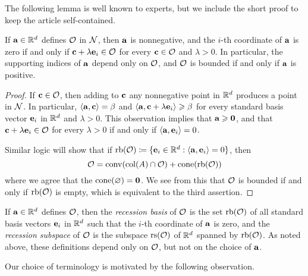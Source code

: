 \documentclass[11pt]{amsart}
\begin{document}
The following lemma is well known to experts, but we include the short proof to keep the article self-contained.

\begin{lemma} 
\label{face: L}
If $\mathbf{a} \in \mathbb{R}^d$ defines $\mathcal{O}$ in $\mathcal{N}$, then $\mathbf{a}$ is nonnegative, and the $i$-th coordinate of $\mathbf{a}$ is zero if and only if $\mathbf{c} + \lambda \mathbf{e}_i \in \mathcal{O}$  for every $\mathbf{c} \in \mathcal{O}$ and $\lambda > 0$.  In particular, the supporting indices of $\mathbf{a}$ depend only on $\mathcal{O}$, and $\mathcal{O}$ is bounded if and only if $\mathbf{a}$ is positive. 
\end{lemma}

\begin{proof}  If $\mathbf{c} \in \mathcal{O}$, then adding to $\mathbf{c}$ any nonnegative point in $\mathbb{R}^d$ produces a point in $\mathcal{N}$.  In particular, $\langle \mathbf{a}, \mathbf{c} \rangle = \beta$ and $\langle \mathbf{a}, \mathbf{c} + \lambda \mathbf{e}_i \rangle \geqslant \beta$ for every standard basis vector $\mathbf{e}_i$ in $\mathbb{R}^d$ and $\lambda > 0$.  This observation implies that $\mathbf{a} \geqslant \mathbf{0}$, and that $\mathbf{c} + \lambda \mathbf{e}_i \in \mathcal{O}$ for every $\lambda > 0$ if and only if $\langle \mathbf{a}, \mathbf{e}_i \rangle = 0$.  

Similar logic will show that if $\operatorname{rb}(\mathcal{O}) \coloneqq  \{ \mathbf{e}_i \in \mathbb{R}^d : \langle \mathbf{a}, \mathbf{e}_i \rangle = 0\}$, then 
\begin{equation}
\label{face: e}
\mathcal{O} =  \operatorname{conv}( \operatorname{col}(A) \cap \mathcal{O} ) + \operatorname{cone}(\operatorname{rb}(\mathcal{O}))
\end{equation}
where we agree that the $\operatorname{cone}(\varnothing) = \mathbf{0}$.  We see from this that $\mathcal{O}$ is bounded if and only if $\operatorname{rb}(\mathcal{O})$ is empty, which is equivalent to the third assertion.  
\end{proof}

\begin{definition}
   If $\mathbf{a} \in \mathbb{R}^d$ defines $\mathcal{O}$, then the \emph{recession basis} of $\mathcal{O}$ is the set $\operatorname{rb}(\mathcal{O})$ of all standard basis vectors $\mathbf{e}_i$ in $\mathbb{R}^d$ such that the $i$-th coordinate of $\mathbf{a}$ is zero, and the \emph{recession subspace} of $\mathcal{O}$ is the subspace $\operatorname{rs}(\mathcal{O})$ of $\mathbb{R}^d$ spanned by $\operatorname{rb}(\mathcal{O})$.  
   As noted above, these definitions depend only on $\mathcal{O}$, but not on the choice of $\mathbf{a}$.
\end{definition}

Our choice of terminology is motivated by the following observation.
\end{document}

